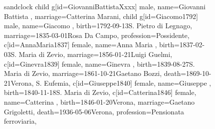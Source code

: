 \documentclass{article}
\begin{document}
\begin{figure}
\begin{minipage}[b]{0.19\textwidth}
    \begin{genealogypicture}[
        processing=database,
        database format=full,
        node size=3.5cm,
        level size=2.8cm,
        level distance=6mm,
        list separators hang=3mm,
        name font=\bfseries,
        surn code={\textcolor{black!50!black}{#1}},
        place text={\newline}{},
        date format=d month yyyy,
        tcbset={male/.style={colframe=blue,colback=blue!5},
        female/.style={colframe=red,colback=red!5}},
        box={fit basedim=7pt,boxsep=2pt,segmentation style=solid,
            halign=left,before upper=\parskip1pt,
            \gtrDBsex,
        },
    ]
    sandclock
    {
        child{
            g[id=GiovanniBattistaXxxx]{
                male,
                name={Giovanni Battista },
                marriage={Catterina Marani}{},
            }
            child{
                g[id=Giacomo1792] {
                    male,
                    name={Giacomo },
                    birth={1792-09-13}{S. Pietro di Legnago},
                    marriage={1835-03-01}{Rosa Da Campo},
                    profession={Possidente},
                }
                c[id=AnnaMaria1837]{
                    female,
                    name={Anna Maria },
                    birth={1837-02-03}{S. Maria di Zevio},
                    marriage={1856-01-21}{Luigi Guelmi},
                }
                c[id=Ginevra1839]{
                    female,
                    name={Ginevra },
                    birth={1839-08-27}{S. Maria di Zevio},
                    marriage={1861-10-21}{Gaetano Bozzi},
                    death={1869-10-21}{Verona, S. Eufemia},
                }
                c[id=Giuseppe1840]{
                    female,
                    name={Giuseppe },
                    birth={1840-11-18}{S. Maria di Zevio},
                }
                c[id=Catterina1846]{
                    female,
                    name={Catterina },
                    birth={1846-01-20}{Verona},
                    marriage={Gaetano Grigoletti}{},
                    death={1936-05-06}{Verona},
                    profession={Pensionata ferroviaria},
                }
            }
        }
    }
    \end{genealogypicture}

\end{minipage}
\end{figure}
\end{document}
